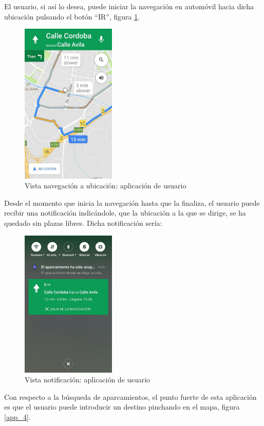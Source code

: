 El usuario, si así lo desea, puede iniciar la navegación en automóvil hacia dicha ubicación pulsando el botón ``IR'', figura \ref{app_3}.
\begin{figure}[H]
	\centering
	\includegraphics[width=0.4\textwidth]{imagenes/app/3.jpg}
	\caption{Vista navegación a ubicación: aplicación de usuario}
	\label{app_3}
\end{figure}
Desde el momento que inicia la navegación hasta que la finaliza, el usuario puede recibir una notificación indicándole, que la ubicación a la que se dirige, se ha quedado sin plazas libres. Dicha notificación sería:
\begin{figure}[H]
	\centering
	\includegraphics[width=0.4\textwidth]{imagenes/app/7.jpg}
	\caption{Vista notificación: aplicación de usuario}
	\label{app_7}
\end{figure}
Con respecto a la búsqueda de aparcamientos, el punto fuerte de esta aplicación es que el usuario puede introducir un destino pinchando en el mapa, figura \ref{app_4}.
